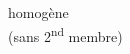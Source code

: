 \documentclass[preview]{standalone}
\begin{document}
\begin{center}
homogène\\(sans 2\textsuperscript{nd} membre)
\end{center}
\end{document}
